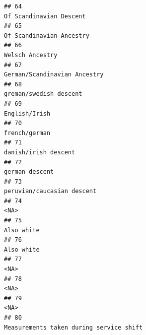 \documentclass[]{article}
\begin{document}
\begin{verbatim}
## 64                                                                                                                              Of Scandinavian Descent
## 65                                                                                                                             Of Scandinavian Ancestry
## 66                                                                                                                                      Welsch Ancestry
## 67                                                                                                                         German/Scandinavian Ancestry
## 68                                                                                                                               greman/swedish descent
## 69                                                                                                                                        English/Irish
## 70                                                                                                                                        french/german
## 71                                                                                                                                 danish/irish descent
## 72                                                                                                                                       german descent
## 73                                                                                                                           peruvian/caucasian descent
## 74                                                                                                                                                 <NA>
## 75                                                                                                                                           Also white
## 76                                                                                                                                           Also white
## 77                                                                                                                                                 <NA>
## 78                                                                                                                                                 <NA>
## 79                                                                                                                                                 <NA>
## 80                                                                                                              Measurements taken during service shift

\end{verbatim}
\end{document}
